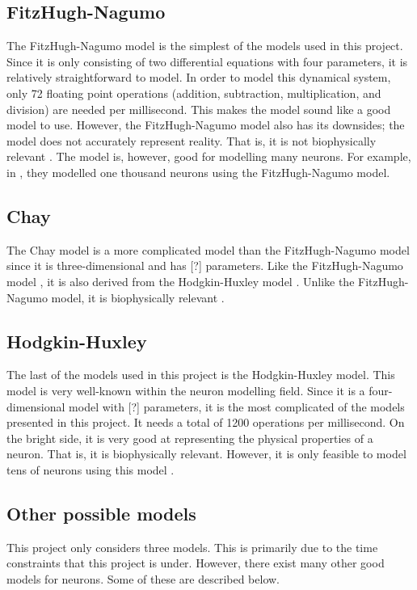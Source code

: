 \documentclass[class={myRUCProject}, crop=false]{standalone}
\begin{document}
\subsection{FitzHugh-Nagumo}
The FitzHugh-Nagumo model is the simplest of the models used in this project. Since it is only consisting of two differential equations with four parameters, it is relatively straightforward to model. In order to model this dynamical system, only 72 floating point operations (addition, subtraction, multiplication, and division) are needed per millisecond. This makes the model sound like a good model to use. However, the FitzHugh-Nagumo model also has its downsides; the model does not accurately represent reality. That is, it is not biophysically relevant \cite{izhikevich2004model}. The model is, however, good for modelling many neurons. For example, in \cite{Ibrahim2021}, they modelled one thousand neurons using the FitzHugh-Nagumo model.


\subsection{Chay}
The Chay model is a more complicated model than the FitzHugh-Nagumo model since it is three-dimensional and has [?] parameters. Like the FitzHugh-Nagumo model \cite{baladron2012}, it is also derived from the Hodgkin-Huxley model \cite{shadizadeh2022}. Unlike the FitzHugh-Nagumo model, it is biophysically relevant \cite{pusuluri2020}.


\subsection{Hodgkin-Huxley}
The last of the models used in this project is the Hodgkin-Huxley model. This model is very well-known within the neuron modelling field. Since it is a four-dimensional model with [?] parameters, it is the most complicated of the models presented in this project. It needs a total of 1200 operations per millisecond. On the bright side, it is very good at representing the physical properties of a neuron. That is, it is biophysically relevant. However, it is only feasible to model tens of neurons using this model \cite{izhikevich2004model}. 

\subsection{Other possible models}
This project only considers three models. This is primarily due to the time constraints that this project is under. However, there exist many other good models for neurons. Some of these are described below.
\end{document}

